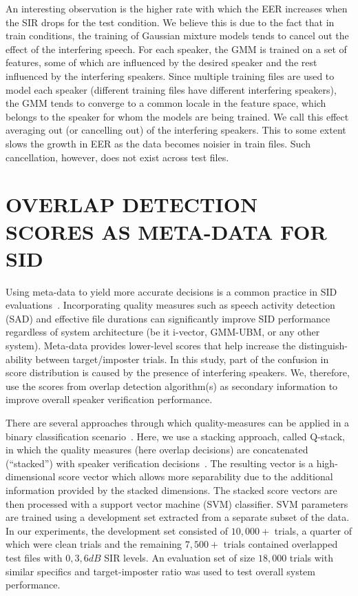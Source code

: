 {An interesting observation is the higher rate with which the EER increases when the SIR drops for the test condition. 
We believe this is due to the fact that in train conditions, the training of Gaussian mixture models tends to cancel out the effect of the interfering speech. 
For each speaker, the GMM is trained on a set of features, some of which are influenced by the desired speaker and the rest influenced by the interfering speakers. 
Since multiple training files are used to model each speaker (different training files have different interfering speakers), the GMM tends to converge to a common locale in the feature space, which belongs to the speaker for whom the models are being trained. 
We call this effect averaging out (or cancelling out) of the interfering speakers. 
This to some extent slows the growth in EER as the data becomes noisier in train files. 
Such cancellation, however, does not exist across test files.


\section{OVERLAP DETECTION SCORES AS META-DATA FOR SID}
\label{sec:ovl_sid_fusion}
Using meta-data to yield more accurate decisions is a common practice in SID evaluations~\cite{bosaris,qual_sid_13}. 
Incorporating quality measures such as speech activity detection (SAD) and effective file durations can significantly improve SID performance~\cite{qual_sid_13,CRSSSRE12} regardless of system architecture (be it i-vector, GMM-UBM, or any other system). 
Meta-data provides lower-level scores that help increase the distinguish-ability between target/imposter trials. 
In this study, part of the confusion in score distribution is caused by the presence of interfering speakers. 
We, therefore, use the scores from overlap detection algorithm(s) as secondary information to improve overall speaker verification performance. 

There are several approaches through which quality-measures can be applied in a binary classification scenario~\cite{bosaris,ietqstack,kelly2013}. 
Here, we use a stacking approach, called Q-stack, in which the quality measures (here overlap decisions) are concatenated (``stacked'') with speaker verification decisions~\cite{ietqstack}. 
The resulting vector is a high-dimensional score vector which allows more separability due to the additional information provided by the stacked dimensions. 
The stacked score vectors are then processed with a support vector machine (SVM) classifier. 
SVM parameters are trained using a development set extracted from a separate subset of the data. 
In our experiments, the development set consisted of $10,000+$ trials, a quarter of which were clean trials and the remaining $7,500+$ trials contained overlapped test files with $0,3,6dB$ SIR levels. 
An evaluation set of size $18,000$ trials with similar specifics and target-imposter ratio was used to test overall system performance.


}
